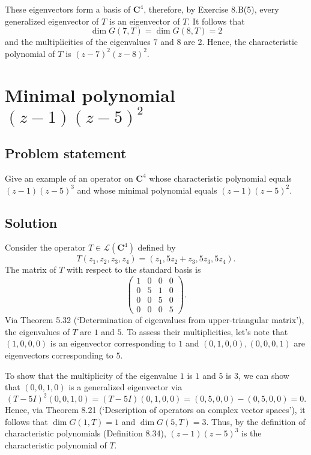 \documentclass{article}
\begin{document}
These eigenvectors form a basis of $\mathbf{C}^4$, therefore, by Exercise 8.B(5), every generalized eigenvector of $T$ is an eigenvector of $T$. 
It follows that
\[\operatorname{dim}G(7,T)=\operatorname{dim}G (8, T) = 2\]
and the multiplicities of the eigenvalues $7$ and $8$ are 2. Hence, the characteristic polynomial of $T$ is $(z-7)^2(z-8)^2$.

\clearpage

\section{Minimal polynomial $(z-1)(z-5)^2$}
\subsection*{Problem statement}
Give an example of an operator on $\mathbf{C}^4$ whose characteristic polynomial equals $(z-1)(z-5)^3$ and whose minimal polynomial equals $(z-1)(z-5)^2$.

\subsection*{Solution}
Consider the operator $T\in\mathcal{L}(\mathbf{C}^4)$ defined by
\begin{equation*}
T(z_1,z_2,z_3,z_4)=(z_1,5z_2+z_3,5z_3,5z_4).
\end{equation*}
The matrix of $T$ with respect to the standard basis is
\begin{equation*}
\begin{pmatrix}
1 & 0 & 0 & 0\\
0 & 5 & 1 & 0\\
0 & 0 & 5 & 0\\
0 & 0 & 0 & 5
\end{pmatrix}.
\end{equation*}
Via Theorem 5.32 (`Determination of eigenvalues from upper-triangular matrix'), the eigenvalues of $T$ are $1$ and $5$. 
To assess their multiplicities, let's note that $(1,0,0,0)$ is an eigenvector corresponding to $1$ and $(0,1,0,0),(0,0,0,1)$ are eigenvectors corresponding to $5$. 

To show that the multiplicity of the eigenvalue $1$ is $1$ and $5$ is $3$, we can show that $(0,0,1,0)$ is a generalized eigenvector via
\[(T-5I)^2(0,0,1,0)=(T-5I)(0,1,0,0)=(0,5,0,0)-(0,5,0,0)=0.\]
Hence, via Theorem 8.21 (`Description of operators on complex vector spaces'), it follows that $\operatorname{dim}G(1,T)=1$ and $\operatorname{dim}G(5,T)=3$. Thus, by the definition of characteristic polynomials (Definition 8.34), $(z-1)(z-5)^3$ is the characteristic polynomial of $T$.
\end{document}
